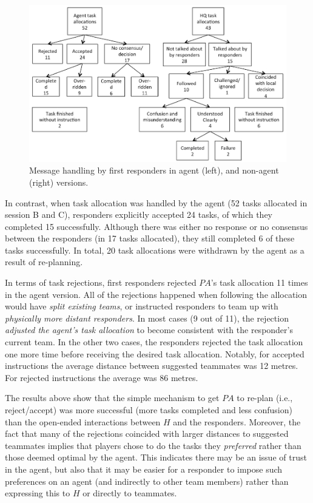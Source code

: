 \begin{figure}[t]
\includegraphics{message_handling.png}
\caption{Message handling by first responders in  agent (left), and non-agent (right) versions.}\label{fig:msgs}
\end{figure}

In contrast, when task allocation was handled by the agent (52 tasks allocated in session B and C), responders explicitly accepted 24 tasks,  of which they completed 15  successfully. Although there was either no response or no consensus between the responders (in 17 tasks allocated), they still completed 6 of these tasks successfully. In total, 20 task allocations were withdrawn by the agent as a result of re-planning. 

In terms of task rejections, first responders rejected $PA$'s task allocation 11 times in the agent version. All of the rejections happened when following the allocation would have \emph{split existing teams}, or instructed responders to team up with \emph{physically more distant responders}. In most cases (9 out of 11), the rejection \emph{adjusted the agent's task allocation} to become consistent with the responder's current team. In the other two cases, the responders rejected the task allocation one more time before receiving the desired task allocation. Notably, for accepted instructions the average distance between suggested teammates was 12 metres. For rejected instructions the average was 86 metres.

The results above show that  the simple mechanism to get $PA$ to re-plan (i.e., reject/accept) was more successful (more tasks completed and less confusion) than the open-ended interactions between $H$ and the responders.  Moreover, the fact that many of the rejections coincided with larger distances to suggested teammates implies that players chose to do the tasks they \emph{preferred} rather than those deemed optimal by the agent. This indicates there may be an issue of trust in the agent, but also that it may be easier for a responder to impose such preferences on an agent (and indirectly to other team members) rather than expressing this to $H$ or directly to teammates. 

